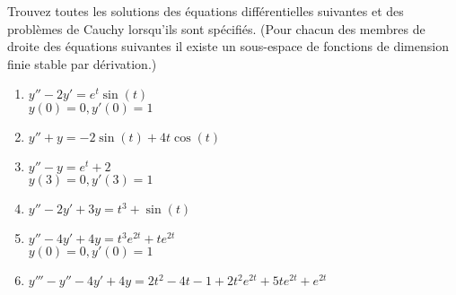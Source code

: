 
\begin{exercice}\label{exoEqsDiff0007}

Trouvez toutes les solutions des équations différentielles suivantes et des problèmes de Cauchy lorsqu'ils sont spécifiés. (Pour chacun des membres de droite des équations suivantes il existe un sous-espace de fonctions de dimension finie stable par dérivation.)
\begin{multicols}{2}
\begin{enumerate}
\item 
$y'' - 2y' = e^{t} \sin(t)$ \\
$y(0) = 0, y'(0)=1$
\item
 $ y'' + y = -2 \sin(t) + 4t \cos(t) $
\item 
$y'' - y = e^t + 2$ \\
$y(3) = 0, y'(3)=1 $
\item 
$  y'' -2y' + 3y = t^3 + \sin(t) $
\item 
$y'' - 4y' + 4y = t^3 e^{2t} + t e^{2t}$ \\
$y(0) = 0, y'(0)=1 $
\item
$y''' - y'' - 4y' + 4y= 2t^2 -4t -1 + 2t^2 e^{2t} + 5te^{2t} + e^{2t}$
\end{enumerate}
\end{multicols}

\end{exercice}
